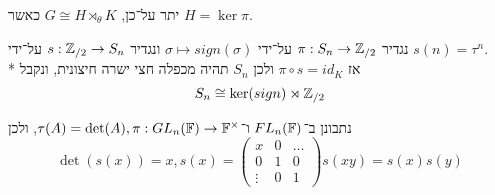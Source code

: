 \begin{remark}
	יתר על־כן, $G \cong H \rtimes_\theta K$ כאשר $H = \ker \pi$.
\end{remark}
\begin{example}
	נגדיר $\pi : S_n \to \mathbb{Z}_{/2}$ על־ידי $\sigma \mapsto sign(\sigma)$ ונגדיר $s : \mathbb{Z}_{/2} \to S_n$ על־ידי $s(n) =\tau^n$. \\*
	אז $\pi \circ s = id_K$ ולכן $S_n$ תהיה מכפלה חצי ישרה חיצונית, ונקבל
	\[
		S_n \cong \ker(sign) \rtimes \mathbb{Z}_{/2}
	\]
\end{example}
\begin{example}
	נתבונן ב־$FL_n(\mathbb{F})$ ו־$\tau(A) = \det(A), \pi : GL_n(\mathbb{F}) \to \mathbb{F}^\times$, ולכן
	\[
		\det(s(x)) = x, s(x) = \begin{pmatrix}
			x & 0 & \dots \\
			0 & 1 & 0 \\
			\vdots & 0 & 1
		\end{pmatrix}
		s(xy) = s(x)s(y)
	\]
\end{example}


